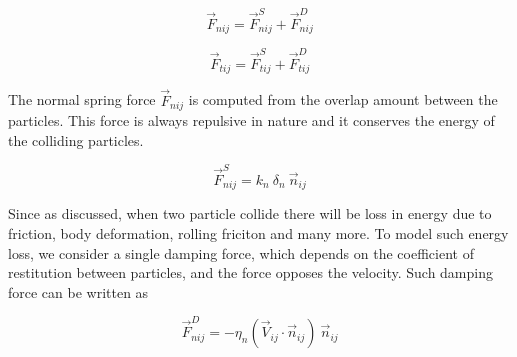 \begin{equation}
  \label{eq:normal_force}
  \vec{F}_{nij} =  \vec{F}_{nij}^S +  \vec{F}_{nij}^D
\end{equation}

\begin{equation}
  \label{eq:tang_force}
  \vec{F}_{tij} =  \vec{F}_{tij}^S +  \vec{F}_{tij}^D
\end{equation}

The normal spring force $\vec{F}_{nij}$ is computed from the overlap
amount between the particles. This force is always repulsive in nature
and it conserves the energy of the colliding particles.

\begin{equation}
  \label{eq:normal_spring_force}
  \vec{F}_{nij}^S = k_n \> \delta_n \> \vec{n}_{ij}
\end{equation}

Since as discussed, when two particle collide there will be loss in
energy due to friction, body deformation, rolling friciton and many
more. To model such energy loss, we consider a single damping force,
which depends on the coefficient of restitution between particles, and
the force opposes the velocity. Such damping force can be written as

\begin{equation}
  \label{eq:normal_damping_force}
  \vec{F}_{nij}^D = -\eta_n  (\vec{V}_{ij} \cdot \vec{n}_{ij}) \> \vec{n}_{ij}
\end{equation}







